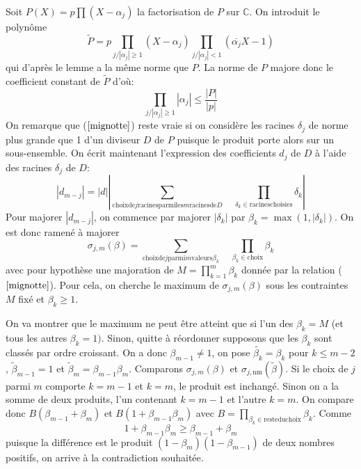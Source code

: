 \documentclass[a4paper,11pt]{book}
\begin{document}
\begin{giacjshere}
Soit $P ( X ) = p \prod ( X - \alpha_j )$ la factorisation de $P$ sur
$\mathbb{C}$. On introduit le polynôme
\[ \tilde{P} = p \prod_{j / | \alpha_j | \geq 1} ( X - \alpha_j )
   \prod_{j / | \alpha_j | < 1} (  \overline{\alpha_j} X - 1 ) \]
qui d'après le lemme a la même norme que $P$. La norme de $P$ majore donc le
coefficient constant de $\tilde{P} $ d'où:
\begin{equation}
  \label{mignotte} \prod_{j / | \alpha_j | \geq 1} | \alpha_j |
  \leq \frac{| P |}{| p |}
\end{equation}
On remarque que (\(\ref{mignotte}\)) reste vraie si on considère les
racines $\delta_j$ de norme plus grande que 1 d'un diviseur $D$ de $P$ puisque
le produit porte alors sur un sous-ensemble. On écrit maintenant l'expression
des coefficients $d_j$ de $D$ à l'aide des racines $\delta_j$ de $D$:
\[ | d_{m - j} | = | d | \left| \sum_{\mbox{choix} \mbox{de} j \mbox{racines}
   \mbox{parmi} \mbox{les} m \mbox{racines} \mbox{de} D} \quad  \prod_{\delta_k \in
   \mbox{racines} \mbox{choisies}} \delta_k \right| \]
Pour majorer $| d_{m - j} |$, on commence par majorer $| \delta_k |$ par
$\beta_k = \max ( 1, | \delta_k | )$. On est donc ramené à majorer
\[ \sigma_{j, m} ( \beta ) = \sum_{\mbox{choix} \mbox{de} j \mbox{parmi} m
   \mbox{valeurs} \beta_k} \quad \prod_{\beta_k \in \mbox{choix}} \beta_k  \]
avec pour hypothèse une majoration de $M = \prod_{k = 1}^m \beta_k$ donnée par
la relation (\(\ref{mignotte}\)). Pour cela, on cherche le maximum de $\sigma_{j,
m} ( \beta )$ sous les contraintes $M$ fixé et $\beta_k \geq 1$.

On va montrer que le maximum ne peut être atteint que si l'un des $\beta_k =
M$ (et tous les autres $\beta_k = 1 )$. Sinon, quitte à réordonner supposons
que les $\beta_k$ sont classés par ordre croissant. On a donc $\beta_{m - 1}
\neq 1$, on pose $\widetilde{\beta_k} = \beta_k$ pour $k \leq m - 2$,
$\tilde{\beta}_{m - 1} = 1$ et $\tilde{\beta}_m = \beta_{m - 1} \beta_m$.
Comparons $\sigma_{j, m} ( \beta )$ et $\sigma_{j, \mbox{nm}} ( \tilde{\beta}
)$. Si le choix de $j$ parmi $m$ comporte $k = m - 1$ et $k = m$, le produit
est inchangé. Sinon on a la somme de deux produits, l'un contenant $k = m - 1$
et l'autre $k = m$. On compare donc $B ( \beta_{m - 1} + \beta_m )$ et $B ( 1
+ \beta_{m - 1} \beta_m )$ avec $B = \prod_{\beta_k \in \mbox{reste} \mbox{du}
\mbox{choix}} \beta_k$. Comme
\[ 1 + \beta_{m - 1} \beta_m \geq \beta_{m - 1} + \beta_m \]
puisque la différence est le produit $(1-\beta_m)(1-\beta_{m-1})$ de deux
nombres positifs, on arrive à la contradiction souhaitée.


\end{giacjshere}
\end{document}
